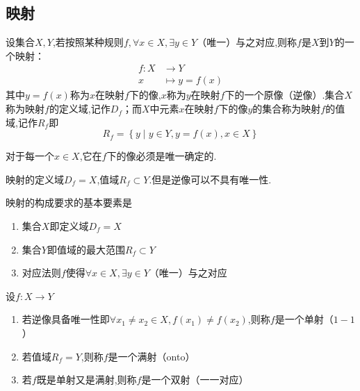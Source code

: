 \subsection{映射}
\begin{formal}
\begin{definition}[映射的定义]\label{def:映射的定义}
    设集合$X,Y$,若按照某种规则$f,\forall x\in X,\exists y\in Y$（唯一）与之对应,则称$f$是$X$到$Y$的一个映射：\begin{align*}
        f:X&\longrightarrow Y\\
        x&\longmapsto y=f\left( x \right)
    \end{align*}
    其中$y=f\left(x\right)$称为$x$在映射$f$下的像,$x$称为$y$在映射$f$下的一个原像（逆像）.集合$X$称为映射$f$的定义域,记作$D_f$；而$X$中元素$x$在映射$f$下的像$y$的集合称为映射$f$的值域,记作$R_f$即\[
    R_f=\left\{
        y\mid y\in Y,y=f\left( x \right),x\in X 
    \right\}
    \]
\end{definition}
\end{formal}
\begin{red}
\begin{remark}
    对于每一个$x\in X$,它在$f$下的像必须是唯一确定的.
\end{remark}
\end{red}
\begin{red}
\begin{remark}
    映射的定义域$D_f=X$,值域$R_f\subset Y$.但是逆像可以不具有唯一性.
\end{remark}
\end{red}
\begin{formal}
    \begin{proposition}[映射的构成]\label{prop:映射的构成}
        映射的构成要求的基本要素是\begin{enumerate}[label={\textup{(\arabic*)}}]
            \item 集合$X$即定义域$D_f=X$
            \item 集合$Y$即值域的最大范围$R_f\subset Y$
            \item 对应法则$f$使得$\forall x\in X,\exists y\in Y$（唯一）与之对应
        \end{enumerate}
    \end{proposition}
\end{formal}
\begin{formal}
    \begin{definition}[满射与单射的定义]\label{def:满射与单射的定义}
        设$f:X\longrightarrow Y$
        \begin{enumerate}[label={\textup{(\arabic*)}}]
            \item 若逆像具备唯一性即$\forall x_1\neq x_2\in X,f\left(x_1\right)\neq f\left(x_2\right)$,则称$f$是一个单射（$1-1$）
            \item 若值域$R_f=Y$,则称$f$是一个满射（\textup{onto}）
            \item 若$f$既是单射又是满射,则称$f$是一个双射（一一对应）
        \end{enumerate}
    \end{definition}
\end{formal}
